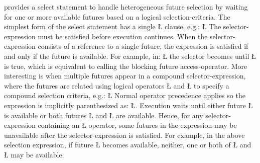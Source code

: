 \documentclass[openright,twoside]{report}
\begin{document}
\uC provides a select statement to handle heterogeneous future selection by waiting for one or more available futures based on a logical selection-criteria.
The simplest form of the select statement has a single \LGinlinetrue\LGbegin\lgrinde\L{}\endlgrinde\LGend{} clause, e.g.:
\LGinlinefalse\LGbegin\lgrinde
\L{}
\endlgrinde\LGend
{}%
The selector-expression must be satisfied before execution continues.
When the selector-expression consists of a reference to a single future, the expression is satisfied if and only if the future is available.
For example, in:
\LGinlinefalse\LGbegin\lgrinde
\L{}
\endlgrinde\LGend
the selector becomes  until \LGinlinetrue\LGbegin\lgrinde\L{}\endlgrinde\LGend{} is true, which is equivalent to calling the blocking future access-operator.
More interesting is when multiple futures appear in a compound selector-expression, where the futures are related using logical operators \LGinlinetrue\LGbegin\lgrinde\L{\LB{\|\,\|}}\endlgrinde\LGend{} and \LGinlinetrue\LGbegin\lgrinde\L{\LB{\&\&}}\endlgrinde\LGend{} to specify a compound selection criteria, e.g.:
\LGinlinefalse\LGbegin\lgrinde
\L{}
\endlgrinde\LGend
Normal operator precedence applies so the expression is implicitly parenthesized as: \LGinlinetrue\LGbegin\lgrinde\L{}\endlgrinde\LGend{}.
Execution waits until either future \LGinlinetrue\LGbegin\lgrinde\L{}\endlgrinde\LGend{} is available or both futures \LGinlinetrue\LGbegin\lgrinde\L{}\endlgrinde\LGend{} and \LGinlinetrue\LGbegin\lgrinde\L{}\endlgrinde\LGend{} are available.
Hence, for any selector-expression containing an \LGinlinetrue\LGbegin\lgrinde\L{\LB{\|\,\|}}\endlgrinde\LGend{} operator, some futures in the expression may be unavailable after the selector-expression is satisfied.
For example, in the above selection expression, if future \LGinlinetrue\LGbegin\lgrinde\L{}\endlgrinde\LGend{} becomes available, neither, one or both of \LGinlinetrue\LGbegin\lgrinde\L{}\endlgrinde\LGend{} and \LGinlinetrue\LGbegin\lgrinde\L{}\endlgrinde\LGend{} may be available.
\end{document}
